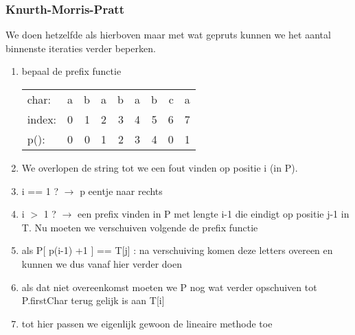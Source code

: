 \subsubsection{Knurth-Morris-Pratt}
We doen hetzelfde als hierboven maar met wat gepruts kunnen we het aantal binnenste iteraties verder beperken.
\begin{enumerate}
\item bepaal de prefix functie
\begin{tabular}{lrrrrrrrr}
char: &a &b &a &b &a &b &c &a \\
index:&0 &1 &2 &3 &4 &5 &6 &7 \\
p():  &0 &0 &1 &2 &3 &4 &0 &1
\end{tabular}
\item We overlopen de string tot we een fout vinden op positie i (in P).
\item i == 1 ? $\rightarrow$ p eentje naar rechts
\item i $>$ 1  ? $\rightarrow$ een prefix vinden in P met lengte i-1 die eindigt op positie j-1 in T. Nu moeten we verschuiven volgende de prefix functie
\item als P[ p(i-1) +1 ] == T[j] : na verschuiving komen deze letters overeen en kunnen we dus vanaf hier verder doen
\item als dat niet overeenkomst moeten we P nog wat verder opschuiven tot P.firstChar terug gelijk is aan T[i]
\item tot hier passen we eigenlijk gewoon de lineaire methode toe


\end{enumerate}
